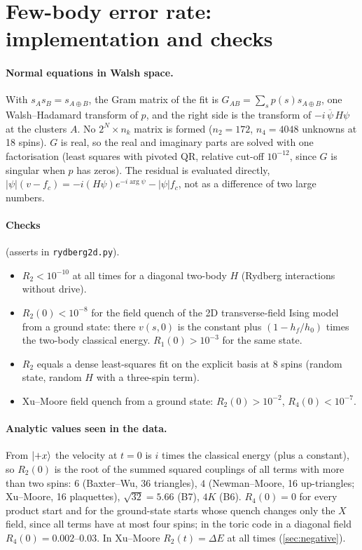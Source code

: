 \documentclass[11pt,a4paper]{article}
\begin{document}
\FloatBarrier
\section{Few-body error rate: implementation and checks}
\label{app:rk}
\paragraph{Normal equations in Walsh space.} With $s_As_B=s_{A\oplus B}$, the Gram matrix of the fit is
$G_{AB}=\sum_sp(s)s_{A\oplus B}$, one Walsh--Hadamard transform of $p$, and the right side is the transform of
$-i\,\overline{\psi}\,H\psi$ at the clusters $A$. No $2^N\times n_k$ matrix is formed ($n_2=172$, $n_4=4048$
unknowns at 18 spins). $G$ is real, so the real and imaginary parts are solved with one factorisation (least squares
with pivoted QR, relative cut-off $10^{-12}$, since $G$ is singular when $p$ has zeros). The residual is evaluated
directly, $\lvert\psi\rvert(v-f_c)=-i(H\psi)e^{-i\arg\psi}-\lvert\psi\rvert f_c$, not as a difference of two large
numbers.

\paragraph{Checks} (asserts in \texttt{rydberg2d.py}).
\begin{itemize}
  \item $R_2<10^{-10}$ at all times for a diagonal two-body $H$ (Rydberg interactions without drive).
  \item $R_2(0)<10^{-8}$ for the field quench of the 2D transverse-field Ising model from a ground state: there
    $v(s,0)$ is the constant plus $(1-h_f/h_0)$ times the two-body classical energy. $R_1(0)>10^{-3}$ for the same state.
  \item $R_2$ equals a dense least-squares fit on the explicit basis at 8 spins (random state, random $H$ with a
    three-spin term).
  \item Xu--Moore field quench from a ground state: $R_2(0)>10^{-2}$, $R_4(0)<10^{-7}$.
\end{itemize}

\paragraph{Analytic values seen in the data.} From $\ket{+x}$ the velocity at $t=0$ is $i$ times the classical
energy (plus a constant), so $R_2(0)$ is the root of the summed squared couplings of all terms with more than two spins:
$6$ (Baxter--Wu, 36 triangles), $4$ (Newman--Moore, 16 up-triangles; Xu--Moore, 16 plaquettes), $\sqrt{32}=5.66$ (B7),
$4K$ (B6). $R_4(0)=0$ for every product start and for the ground-state starts whose quench changes only the
$X$ field, since all terms have at most four spins; in the toric code in a diagonal field $R_4(0)=0.002$--$0.03$. In Xu--Moore $R_2(t)=\Delta E$ at all times (\cref{sec:negative}).
\end{document}

